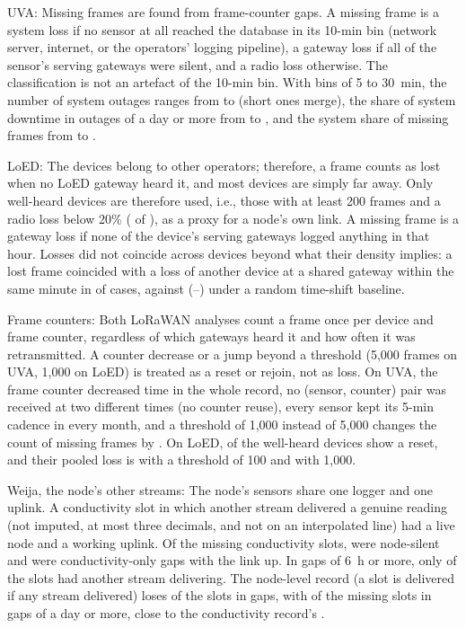 \documentclass[journal]{IEEEtran}
\begin{document}
UVA: Missing frames are found from frame-counter gaps. A missing frame is a system loss if no sensor at all reached the database in its 10-min bin (network server, internet, or the operators' logging pipeline), a gateway loss if all of the sensor's serving gateways were silent, and a radio loss otherwise. The classification is not an artefact of the 10-min bin. With bins of 5 to 30~min, the number of system outages ranges from \uvaBinOutMax{} to \uvaBinOutMin{} (short ones merge), the share of system downtime in outages of a day or more from \uvaBinDayMin{} to \uvaBinDayMax{}, and the system share of missing frames from \uvaBinSysMin{} to \uvaBinSysMax{}.

LoED: The devices belong to other operators; therefore, a frame counts as lost when no LoED gateway heard it, and most devices are simply far away. Only well-heard devices are therefore used, i.e., those with at least 200 frames and a radio loss below 20\% (\loedWellHeard{} of \loedDevicesTwoHundred{}), as a proxy for a node's own link. A missing frame is a gateway loss if none of the device's serving gateways logged anything in that hour. Losses did not coincide across devices beyond what their density implies: a lost frame coincided with a loss of another device at a shared gateway within the same minute in \loedCoLoss{} of cases, against \loedCoLossBase{} (\loedCoLossLo--\loedCoLossHi) under a random time-shift baseline.

Frame counters: Both LoRaWAN analyses count a frame once per device and frame counter, regardless of which gateways heard it and how often it was retransmitted. A counter decrease or a jump beyond a threshold (5{,}000 frames on UVA, 1{,}000 on LoED) is treated as a reset or rejoin, not as loss. On UVA, the frame counter decreased \uvaDecreases{} time in the whole record, no (sensor, counter) pair was received at two different times (no counter reuse), every sensor kept its 5-min cadence in every month, and a threshold of 1{,}000 instead of 5{,}000 changes the count of missing frames by \uvaMissThouVsFive. On LoED, \loedResetDevices{} of the \loedWellHeardN{} well-heard devices show a reset, and their pooled loss is \loedLossHundred{} with a threshold of 100 and \loedLossThousand{} with 1{,}000.

Weija, the node's other streams: The node's sensors share one logger and one uplink. A conductivity slot in which another stream delivered a genuine reading (not imputed, at most three decimals, and not on an interpolated line) had a live node and a working uplink. Of the \weijaEcMissing{} missing conductivity slots, \weijaNodeSilentShare{} were node-silent and \weijaOtherStreamShare{} were conductivity-only gaps with the link up. In gaps of 6~h or more, only \weijaLongAliveShare{} of the slots had another stream delivering. The node-level record (a slot is delivered if any stream delivered) loses \weijaNodeLoss{} of the slots in \weijaNodeGaps{} gaps, with \weijaNodeDayLost{} of the missing slots in gaps of a day or more, close to the conductivity record's \weijaCondDayLost{}.
\end{document}
